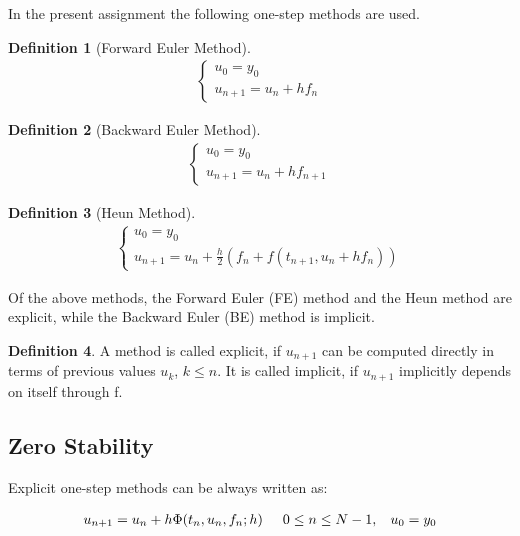 \documentclass[11pt]{article}
\theoremstyle{theorem}
\theoremstyle{definition}
\newtheorem{definition}{Definition}
\begin{document}
In the present assignment the following one-step methods are used.\\

\begin{definition}[Forward Euler Method]
	\label{def:FE}
	\begin{align}
	\begin{cases}
	\label{eqn:FE}
	u_0=y_0\\
	u_{n+1}=u_n+hf_n
	\end{cases}
	\end{align}
\end{definition}

\begin{definition}[Backward Euler Method]
	\label{def:BE}
	\begin{align}
	\begin{cases}
	\label{eqn:BE}
	u_0=y_0\\
	u_{n+1}=u_n+hf_{n+1}
	\end{cases}
	\end{align}
\end{definition}

\begin{definition}[Heun Method]
	\label{def:Heun}
	\begin{align}
	\begin{cases}
	\label{eqn:Heun}
	u_0=y_0\\
	u_{n+1}=u_n+\frac{h}{2}(f_n+f(t_{n+1}, u_n+hf_n))
	\end{cases}
	\end{align}
\end{definition}

Of the above methods, the Forward Euler (FE) method and the Heun method are explicit,
while the Backward Euler (BE) method is implicit.

\begin{definition}
	\label{def:implicit-explicit}
	A method is called explicit, if $u_{n+1}$ can be computed directly in terms of previous values $u_k$, $k\le n$. It is called implicit, if $u_{n+1}$ implicitly depends on itself through f.
\end{definition}

\subsection{Zero Stability}
Explicit one-step methods can be always written as:

\begin{align}
	\label{eqn:one-step-method}
	u_{n+1}=u_n+h\Phi(t_n,u_n,f_n;h)\hspace{5mm}0\le n\le N-1,\hspace{3mm}u_0=y_0
\end{align}
\end{document}
